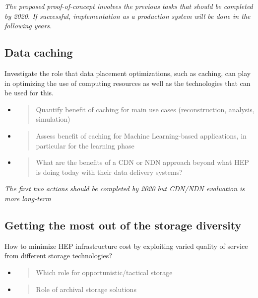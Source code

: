 \documentclass[12pt,a4paper]{article}
\begin{document}
\emph{The proposed proof-of-concept involves the previous tasks that should be completed by 2020. If successful,
implementation as a production system will be done in the following years.}

\subsection{Data caching}\label{data-caching}
Investigate the role that data placement optimizations, such as caching,
can play in optimizing the use of computing resources as well as the
technologies that can be used for this.

\begin{itemize}
\item
  \begin{quote}
  \protect\hypertarget{_z9tvlvkzecc1}{}{}Quantify benefit of caching for
  main use cases (reconstruction, analysis, simulation)
  \end{quote}
\item
  \begin{quote}
  \protect\hypertarget{_vyj6hh4exb5m}{}{}Assess benefit of caching for
  Machine Learning-based applications, in particular for the learning
  phase
  \end{quote}
\item
  \begin{quote}
  \protect\hypertarget{_ob8u0lfv3fum}{}{}What are the benefits of a CDN
  or NDN approach beyond what HEP is doing today with their data
  delivery systems?
  \end{quote}
\end{itemize}

\emph{The first two actions should be completed by 2020 but CDN/NDN
evaluation is more long-term}

\subsection{Getting the most out of the
storage diversity}\label{storage-diversity}
How to minimize HEP infrastructure cost by
exploiting varied quality of service from different storage
technologies?

\begin{itemize}
\item
  \begin{quote}
  \protect\hypertarget{_tmwkcbnhjw6g}{}{}Which role for
  opportunistic/tactical storage
  \end{quote}
\item
  \begin{quote}
  \protect\hypertarget{_tpsd2vti9z2o}{}{}Role of archival storage
  solutions
  \end{quote}
\end{itemize}
\end{document}

